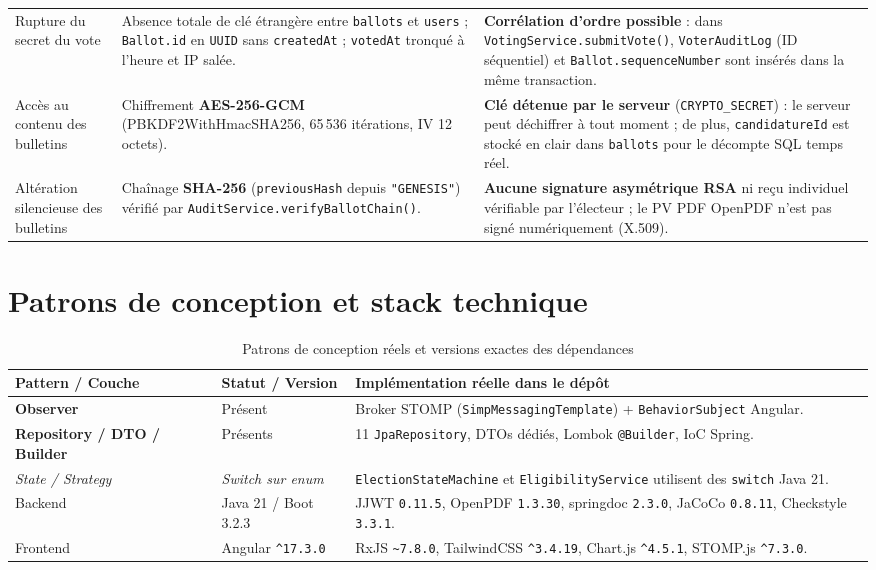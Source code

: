 \begin{longtable}{@{}p{}p{}p{}@{}}
Rupture du secret du vote & Absence totale de clé étrangère entre \texttt{ballots} et \texttt{users} ; \texttt{Ballot.id} en \texttt{UUID} sans \texttt{createdAt} ; \texttt{votedAt} tronqué à l'heure et IP salée. & \textbf{Corrélation d'ordre possible} : dans \texttt{VotingService.submitVote()}, \texttt{VoterAuditLog} (ID séquentiel) et \texttt{Ballot.sequenceNumber} sont insérés dans la même transaction. \\
Accès au contenu des bulletins & Chiffrement \textbf{AES-256-GCM} (PBKDF2WithHmacSHA256, 65\,536 itérations, IV 12\,octets). & \textbf{Clé détenue par le serveur} (\texttt{CRYPTO\_SECRET}) : le serveur peut déchiffrer à tout moment ; de plus, \texttt{candidatureId} est stocké en clair dans \texttt{ballots} pour le décompte SQL temps réel. \\
Altération silencieuse des bulletins & Chaînage \textbf{SHA-256} (\texttt{previousHash} depuis \texttt{"GENESIS"}) vérifié par \texttt{AuditService.verifyBallotChain()}. & \textbf{Aucune signature asymétrique RSA} ni reçu individuel vérifiable par l'électeur ; le PV PDF OpenPDF n'est pas signé numériquement (X.509). \\
\end{longtable}

\section{Patrons de conception et stack technique}

\begin{table}[H]
\centering
\caption{Patrons de conception réels et versions exactes des dépendances}
\label{tab:patterns-stack}
\small
\begin{tabularx}{\textwidth}{@{}llX@{}}
\toprule
\rowcolor{uaszlight}
\textbf{Pattern / Couche} & \textbf{Statut / Version} & \textbf{Implémentation réelle dans le dépôt} \\
\midrule
\textbf{Observer} & Présent & Broker STOMP (\texttt{SimpMessagingTemplate}) + \texttt{BehaviorSubject} Angular. \\
\textbf{Repository / DTO / Builder} & Présents & 11 \texttt{JpaRepository}, DTOs dédiés, Lombok \texttt{@Builder}, IoC Spring. \\
\textit{State / Strategy} & \textit{Switch sur enum} & \texttt{ElectionStateMachine} et \texttt{EligibilityService} utilisent des \texttt{switch} Java 21. \\
\midrule
Backend & Java 21 / Boot 3.2.3 & JJWT \texttt{0.11.5}, OpenPDF \texttt{1.3.30}, springdoc \texttt{2.3.0}, JaCoCo \texttt{0.8.11}, Checkstyle \texttt{3.3.1}. \\
Frontend & Angular \texttt{\^{}17.3.0} & RxJS \texttt{\~{}7.8.0}, TailwindCSS \texttt{\^{}3.4.19}, Chart.js \texttt{\^{}4.5.1}, STOMP.js \texttt{\^{}7.3.0}. \\
\bottomrule
\end{tabularx}
\end{table}
